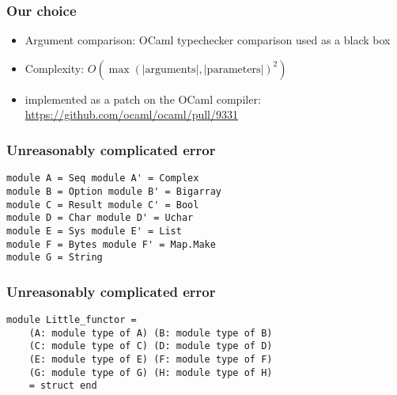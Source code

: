 \documentclass[11pt,aspectratio=169]{beamer}
\begin{document}
\begin{frame}\frametitle{Our choice}
  \begin{itemize}
    \item{Argument comparison: OCaml typechecker comparison used as a black box}
    \item{Complexity: $O(\max(\mathrm{|arguments|,|parameters|})^2)$}
    \item{implemented as a patch on the OCaml compiler:
      \url{https://github.com/ocaml/ocaml/pull/9331} }
  \end{itemize}
\end{frame}


\begin{frame}[fragile]\frametitle{Unreasonably complicated error}
\begin{verbatim}
module A = Seq module A' = Complex
module B = Option module B' = Bigarray
module C = Result module C' = Bool
module D = Char module D' = Uchar
module E = Sys module E' = List
module F = Bytes module F' = Map.Make
module G = String
\end{verbatim}
\end{frame}
\begin{frame}[fragile]\frametitle{Unreasonably complicated error}
\begin{verbatim}
module Little_functor =
    (A: module type of A) (B: module type of B)
    (C: module type of C) (D: module type of D)
    (E: module type of E) (F: module type of F)
    (G: module type of G) (H: module type of H)
    = struct end
\end{verbatim}
\end{frame}
\end{document}
